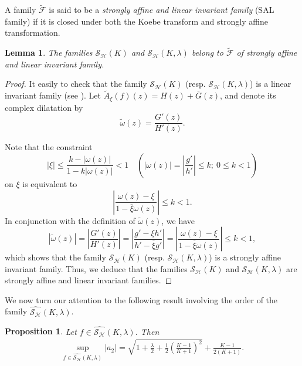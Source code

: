 \documentclass[11pt, reqno]{amsart}
\newtheorem{lemma}{Lemma}
\newtheorem{prop}{Proposition}
\numberwithin{equation}{section}
\newcommand{\abs}[1]{\left\vert#1\right\vert}
\begin{document}
 A family $\mathcal{\widetilde{F}}$ is said to be a \textit{strongly affine and linear invariant family}
(SAL family) if it is closed under both the Koebe transform and strongly affine transformation.

\begin{lemma}\label{t012}
The families \( \mathcal{S}_{\mathcal H}(K) \) and \({\mathcal{S}_\mathcal{H}}(K,\lambda)\) belong to $\mathcal{\widetilde{F}}$ of strongly affine and linear invariant family.
\end{lemma}
\begin{proof}
It easily to check that the family \( \mathcal{S}_{\mathcal H}(K) \) (resp. \({\mathcal{S}_\mathcal{H}}(K,\lambda)\)) is a linear invariant family (see \cite[p. 9]{DR}).
Let $\widetilde{A}_{\xi}(f)(z)=H(z)+\overline{G}(z)$, and denote its complex dilatation by $$\widetilde{\omega}(z)=\frac{G'(z)}{H'(z)}.$$

Note that %
the constraint \[|\xi| \leq \frac{k - |\omega(z)|}{1 - k|\omega(z)|}<1 \quad \left(|\omega(z)| = \left|\frac{g'}{h'}\right| \leq k; \ 0\leq k < 1\right)\] on \(\xi\) is equivalent to
\[\left| \frac{\omega(z) - \xi}{1 - \overline{\xi} \omega(z)} \right| \leq k < 1.\] In conjunction with the definition of \(\widetilde{\omega}(z)\), we have \[|\widetilde{\omega}(z)| = \left| \frac{G'(z)}{H'(z)} \right| = \left| \frac{g' - \xi h'}{h' - \overline{\xi} g'} \right| = \left| \frac{\omega(z) - \xi}{1 - \overline{\xi} \omega(z)} \right| \leq k < 1,\]
which shows that the family \( \mathcal{S}_\mathcal{H}(K) \) (resp. \({\mathcal{S}_\mathcal{H}}(K,\lambda)\)) is a strongly affine invariant family. 
Thus, we deduce that the families \( \mathcal{S}_\mathcal{H}(K) \) and \({\mathcal{S}_\mathcal{H}}(K,\lambda)\) are {strongly affine and linear invariant families}. 
\end{proof}



We now turn our attention to the following result involving the order of the family \(\widehat{\mathcal{S}_\mathcal{H}}(K,\lambda)\).

\begin{prop} \label{c1}
Let $f\in\widehat{\mathcal{S}_\mathcal{H}}(K,\lambda)$. %
Then
\begin{align*}
\sup\limits_{f\in\widehat{\mathcal{S}_\mathcal{H}}(K,\lambda)}\abs{a_2}=\sqrt{1+\frac{\lambda}{2}+\frac{1}{2}\left(\frac{K-1}{K+1}\right)^2}+\frac{K-1}{2\left({K+1}\right)}. 
\end{align*}
\end{prop}
\end{document}
